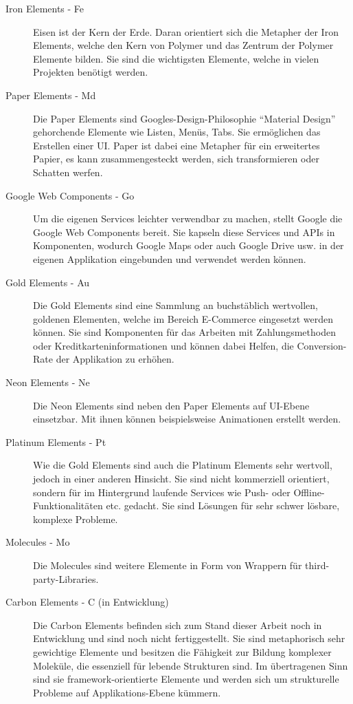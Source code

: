 \begin{description}
  \item[Iron Elements - Fe] Eisen ist der Kern der Erde. Daran orientiert sich die Metapher der Iron Elements, welche den Kern von Polymer und das Zentrum der Polymer Elemente bilden. Sie sind die wichtigsten Elemente, welche in vielen Projekten benötigt werden.
  \item[Paper Elements - Md] Die Paper Elements sind Googles-Design-Philosophie ``Material Design'' gehorchende Elemente wie Listen, Menüs, Tabs. Sie ermöglichen das Erstellen einer \ac{UI}. Paper ist dabei eine Metapher für ein erweitertes Papier, es kann zusammengesteckt werden, sich transformieren oder Schatten werfen.
  \item[Google Web Components - Go] Um die eigenen Services leichter verwendbar zu machen, stellt Google die Google Web Components bereit. Sie kapseln diese Services und \ac{API}s in Komponenten, wodurch Google Maps oder auch Google Drive usw. in der eigenen Applikation eingebunden und verwendet werden können.
  \item[Gold Elements - Au] Die Gold Elements sind eine Sammlung an buchstäblich wertvollen, goldenen Elementen, welche im Bereich E-Commerce eingesetzt werden können. Sie sind Komponenten für das Arbeiten mit Zahlungsmethoden oder Kreditkarteninformationen und können dabei Helfen, die Conversion-Rate der Applikation zu erhöhen.
  \item[Neon Elements - Ne] Die Neon Elements sind neben den Paper Elements auf \ac{UI}-Ebene einsetzbar. Mit ihnen können beispielsweise Animationen erstellt werden.
  \item[Platinum Elements - Pt] Wie die Gold Elements sind auch die Platinum Elements sehr wertvoll, jedoch in einer anderen Hinsicht. Sie sind nicht kommerziell orientiert, sondern für im Hintergrund laufende Services wie Push- oder Offline-Funk\-tio\-na\-li\-tä\-ten etc. gedacht. Sie sind Lösungen für sehr schwer lösbare, komplexe Probleme.
  \item[Molecules - Mo] Die Molecules sind weitere Elemente in Form von Wrappern für third-party-Lib\-rar\-ies.
  \item[Carbon Elements - C (in Entwicklung)] Die Carbon Elements befinden sich zum Stand dieser Arbeit noch in Entwicklung und sind noch nicht fertiggestellt. Sie sind metaphorisch sehr gewichtige Elemente und besitzen die Fähigkeit zur Bildung komplexer Moleküle, die essenziell für lebende Strukturen sind. Im übertragenen Sinn sind sie framework-orientierte Elemente und werden sich um strukturelle Probleme auf Applikations-Ebene kümmern.
\end{description}


